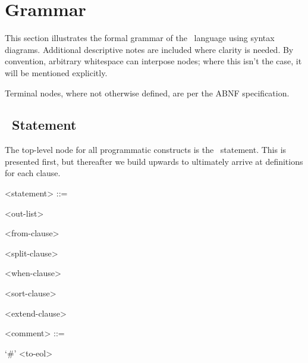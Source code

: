 % 
% 
% 
% 
% 

\section{Grammar}

This section illustrates the formal grammar of the \stag\ language using
syntax diagrams. Additional descriptive notes are included where clarity
is needed. By convention, arbitrary whitespace can interpose nodes;
where this isn't the case, it will be mentioned explicitly.

Terminal nodes, where not otherwise defined, are per the ABNF
specification\cite{RFC5234}.

\subsection{\stag\ Statement}

The top-level node for all programmatic constructs is the \stag\
statement. This is presented first, but thereafter we build upwards to
ultimately arrive at definitions for each clause.

\begin{grammar}
  <statement> ::= \begin{syntdiag}
    <out-list>
    \begin{stack}
      <from-clause> \\
    \end{stack}
    \begin{stack}
      <split-clause> \\
    \end{stack}
    \begin{stack}
      <when-clause> \\
    \end{stack}
    \begin{stack}
      <sort-clause> \\
    \end{stack}
    \begin{stack}
      <extend-clause> \\
    \end{stack}
  \end{syntdiag}

  <comment> ::= \begin{syntdiag}
    `#'
    <to-eol>
  \end{syntdiag}
\end{grammar}

